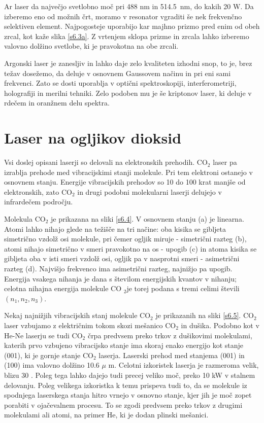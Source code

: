 Ar laser da največjo svetlobno moč pri 488 nm in 514.5~nm, do kakih 20 W.
Da izberemo eno od možnih črt, moramo v resonator vgraditi še nek
frekvenčno selektiven element. Najpogosteje uporabijo kar majhno prizmo
pred enim od obeh zrcal, kot kaže slika \ref{s6.3a}. Z vrtenjem sklopa
prizme in zrcala lahko izberemo valovno dolžino svetlobe, ki je pravokotna
na obe zrcali.

Argonski laser je zanesljiv in lahko daje zelo kvaliteten izhodni snop, to
je, brez težav dosežemo, da deluje v osnovnem Gaussovem načinu in pri eni
sami frekvenci. Zato se dosti uporablja v optični spektroskopiji,
interferometriji, holografiji in merilni tehniki. Zelo podoben mu je še
kriptonov laser, ki deluje v rdečem in oranžnem delu spektra.

\section{Laser na ogljikov dioksid}

Vsi doslej opisani laserji so delovali na elektronskih prehodih. CO$_2$
laser pa izrablja prehode med vibracijskimi stanji molekule. Pri tem
elektroni ostanejo v osnovnem stanju. Energije vibracijskih prehodov so 10
do 100 krat manjše od elektronskih, zato CO$_2$ in drugi podobni
molekularni laserji delujejo v infrardečem področju.

Molekula CO$_2$ je prikazana na sliki \ref{s6.4}. V osnovnem stanju (a) je
linearna. Atomi lahko nihajo glede na težišče na tri načine: oba kisika
se gibljeta simetrično vzdolž osi molekule, pri čemer ogljik miruje -
simetrični razteg (b), atomi nihajo simetrično v smeri pravokotno na os -
upogib (c) in atoma kisika se gibljeta oba v isti smeri vzdolž osi, ogljik
pa v nasprotni smeri - asimetrični razteg (d). Najvišjo frekvenco ima
asimetrični razteg, najnižjo pa upogib. Energija vsakega nihanja je dana s
številom energijskih kvantov v nihanju; celotna nihajna energija molekule CO%
$_2$je torej podana s tremi celimi števili $(n_1,n_2,n_3)$.

Nekaj najnižjih vibracijskih stanj molekule CO$_2$ je prikazanih na sliki 
\ref{s6.5}. CO$_2$ laser vzbujamo z električnim tokom skozi mešanico CO$_2$
in dušika. Podobno kot v He-Ne laserju se tudi CO$_2$ črpa predvsem preko
trkov z dušikovimi molekulami, katerih prvo vzbujeno vibracijsko stanje ima
skoraj enako energijo kot stanje (001), ki je gornje stanje CO$_2$ laserja.
Laserski prehod med stanjema (001) in (100) ima valovno dolžino 10.6 $\mu$%
m. Celotni izkoristek laserja je razmeroma velik, blizu 30%
. Poleg tega lahko dajejo tudi precej veliko moč, preko
10 kW v stalnem delovanju. Poleg velikega izkoristka k temu prispeva tudi
to, da se molekule iz spodnjega laserskega stanja hitro vrnejo v osnovno
stanje, kjer jih je moč zopet porabiti v ojačevalnem procesu. To se zgodi
predvsem preko trkov z drugimi molekulami ali atomi, na primer He, ki je
dodan plinski mešanici.

